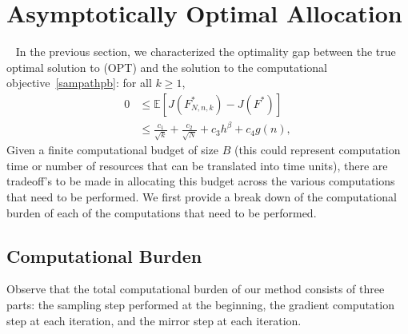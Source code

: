 \documentclass[11pt,leqno]{amsart}
\begin{document}
\section{Asymptotically Optimal Allocation}~\label{sec:allocate}
In the previous section, we characterized the optimality gap between the true optimal solution to (OPT) and the solution to the computational objective~\eqref{sampathpb}:
for all $k \geq 1$, 
\begin{equation}\label{saafinbd} 
\begin{aligned}
0 &\leq \mathbb{E}\left[ J(F^*_{N,n,k}) - J(F^*)\right]\\
&\leq \frac{c_1}{\sqrt{k}} + \frac{c_2}{\sqrt{N}} + c_3h^{\beta} + c_4 g(n),    
\end{aligned}
\end{equation}
Given a finite computational budget of size $B$ (this could represent computation time or number of resources that can be translated into time units), there are tradeoff's to be made in allocating this budget across the various computations that need to be performed. We first provide a break down of the computational burden of each of the computations that need to be performed. 

\subsection{Computational Burden}
Observe that the total computational burden of our method consists of three parts: the sampling step performed at the beginning, the gradient computation step at each iteration, and the mirror step at each iteration. 
\end{document}
